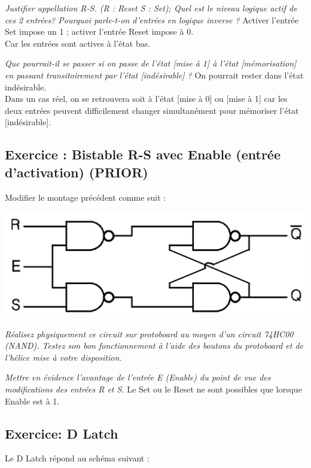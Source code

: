{
\textit{Justifier appellation R-S. (R : Reset S : Set); Quel est le niveau logique actif de ces 2 entrées?
Pourquoi parle-t-on d'entrées en logique inverse ?}
}
{%
Activer l’entrée Set impose un 1 ; activer l’entrée Reset impose à 0.\\
Car les entrées sont actives à l’état bas.
}

{
\textit{Que pourrait-il se passer si on passe de l'état [mise à 1] à l'état [mémorisation] en passant
transitoirement par l'état [indésirable] ?}
}
{%
On pourrait rester dans l’état indésirable.\\
Dans un cas réel, on se retrouvera soit à l’état [mise à 0] ou [mise à 1] car les deux entrées peuvent difficilement changer simultanément pour mémoriser l’état [indésirable].
}

\subsection{Exercice : Bistable R-S avec Enable (entrée d'activation) (PRIOR)}
Modifier le montage précédent comme suit :
\begin{center}
\includegraphics[scale=0.3]{Labo3_RSavecE.png}
\end{center}

{
\textit{Réalisez physiquement ce circuit sur protoboard au moyen d’un circuit 74HC00 (NAND). Testez
son bon fonctionnement à l’aide des boutons du protoboard et de l’hélice mise à votre disposition.}
}
{%
}

{
\textit{Mettre en évidence l'avantage de l'entrée E (Enable) du point de vue des modifications des
entrées R et S.}
}
{%
Le Set ou le Reset ne sont possibles que lorsque Enable est à 1.
}

\subsection{Exercice: D Latch}
Le D Latch répond au schéma suivant :

